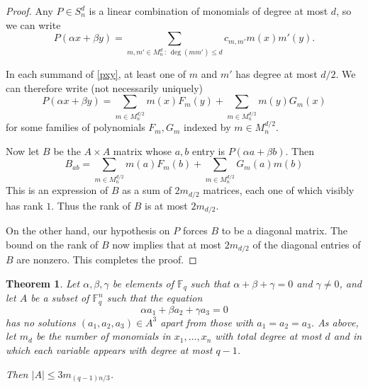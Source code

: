 \documentclass[12pt]{amsart}
\newcommand{\field}[1]{\mathbb{#1}}
\newcommand{\F}{\field{F}}
\newcommand{\beq}{\begin{displaymath}}
\newcommand{\eeq}{\end{displaymath}}
\theoremstyle{plain}
\newtheorem{thm}{Theorem}
\theoremstyle{definition}
\theoremstyle{remark}
\begin{document}
\begin{proof}

\medskip

Any $P \in S_n^d$ is a linear combination of monomials of degree at most $d$, so we can write
\begin{equation}
\label{pxy}
P(\alpha x+\beta y) = \sum_{m,m' \in M_n^d\,:\,\deg(mm') \leq d} c_{m,m'} m(x) m'(y). 
\end{equation}

In each summand of \eqref{pxy}, at least one of $m$ and $m'$ has degree at most $d/2$.  We can therefore write (not necessarily uniquely)
\beq
P(\alpha x+\beta y) = \sum_{m \in M_n^{d/2}} m(x) F_m(y) + \sum_{m \in M_n^{d/2}} m(y) G_{m}(x)
\eeq
for some families of polynomials $F_m,G_m$ indexed by $m \in M_n^{d/2}$. 



Now let $B$ be the $A \times A$ matrix whose $a,b$ entry is $P(\alpha a + \beta b)$.  Then
\beq
B_{ab} =  \sum_{m \in M_n^{d/2}} m(a) F_m(b) + \sum_{m \in M_n^{d/2}} G_{m}(a) m(b)
\eeq
This is an expression of $B$ as a sum of $2m_{d/2}$ matrices, each one of which visibly has rank $1$.  Thus the rank of $B$ is at most $2 m_{d/2}$.

On the other hand, our hypothesis on $P$ forces $B$ to be a diagonal matrix.  The bound on the rank of $B$ now implies that at most $2 m_{d/2}$ of the diagonal entries of $B$ are nonzero.  This completes the proof.

\end{proof}

\begin{thm} Let $\alpha, \beta, \gamma$ be elements of $\F_q$ such that $\alpha + \beta + \gamma = 0$ and $\gamma \neq 0$, and let $A$ be a subset of $\F_q^n$ such that the equation
\beq
\alpha a_1 + \beta a_2 + \gamma a_3=0
\eeq
has no solutions $(a_1,a_2,a_3) \in A^3$ apart from those with $a_1=a_2=a_3$.  As above, let $m_d$ be the number of monomials in $x_1, \ldots, x_n$ with total degree at most $d$ and in which each variable appears with degree at most $q-1$.

Then $|A| \leq 3m_{(q-1)n/3}$.
\label{th:main}
\end{thm}
\end{document}
